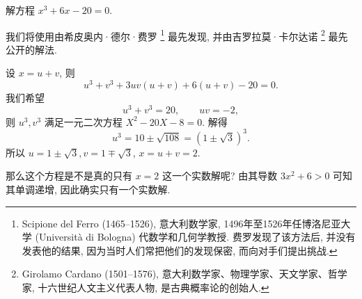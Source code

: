\begin{example}
  解方程 $x^3+6x-20=0$.
\end{example}

我们将使用由希皮奥内·德尔·费罗%
  \footnote{%
    Scipione del Ferro (1465--1526), 意大利数学家, 1496年至1526年任博洛尼亚大学 (Universit\`a di Bologna) 代数学和几何学教授. 费罗发现了该方法后, 并没有发表他的结果, 因为当时人们常把他们的发现保密, 而向对手们提出挑战\cite{Kline1990}.
  }%
最先发现, 并由吉罗拉莫·卡尔达诺%
  \footnote{%
    Girolamo Cardano (1501--1576), 意大利数学家、物理学家、天文学家、哲学家, 十六世纪人文主义代表人物, 是古典概率论的创始人\cite{Cardano1643,Cardano1663}.
  }%
最先公开的解法.

\begin{solution}
  设 $x=u+v$, 则
    \[u^3+v^3+3uv(u+v)+6(u+v)-20=0.\]
  我们希望
    \[u^3+v^3=20,\qquad uv=-2,\]
  则 $u^3,v^3$ 满足一元二次方程 $X^2-20X-8=0$.
  解得
    \[u^3=10\pm\sqrt{108}{=(1\pm\sqrt3)^3.}\]
  所以 $u=1\pm\sqrt3, v=1\mp\sqrt 3$, $x=u+v=2$.
\end{solution}

那么这个方程是不是真的只有 $x=2$ 这一个实数解呢?
由其导数 $3x^2+6>0$ 可知其单调递增, 因此确实只有一个实数解.


